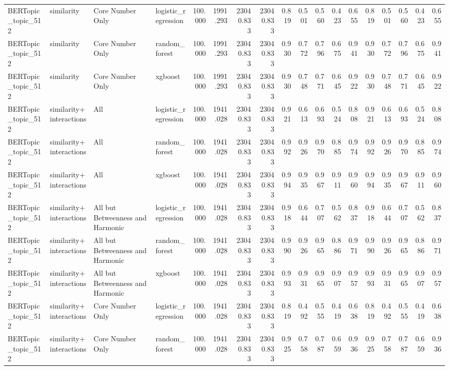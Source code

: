 \begin{tabular}{llllrrrrrrrrrrrrrr}
BERTopic\_topic\_512 & similarity & Core Number Only & logistic\_regression & 100.000 & 1991.293 & 23040.833 & 23040.833 & 0.819 & 0.501 & 0.560 & 0.423 & 0.655 & 0.819 & 0.501 & 0.560 & 0.423 & 0.655 \\
BERTopic\_topic\_512 & similarity & Core Number Only & random\_forest & 100.000 & 1991.293 & 23040.833 & 23040.833 & 0.930 & 0.772 & 0.796 & 0.675 & 0.941 & 0.930 & 0.772 & 0.796 & 0.675 & 0.941 \\
BERTopic\_topic\_512 & similarity & Core Number Only & xgboost & 100.000 & 1991.293 & 23040.833 & 23040.833 & 0.930 & 0.748 & 0.771 & 0.645 & 0.922 & 0.930 & 0.748 & 0.771 & 0.645 & 0.922 \\
BERTopic\_topic\_512 & similarity+interactions & All & logistic\_regression & 100.000 & 1941.028 & 23040.833 & 23040.833 & 0.921 & 0.613 & 0.693 & 0.524 & 0.808 & 0.921 & 0.613 & 0.693 & 0.524 & 0.808 \\
BERTopic\_topic\_512 & similarity+interactions & All & random\_forest & 100.000 & 1941.028 & 23040.833 & 23040.833 & 0.992 & 0.926 & 0.970 & 0.885 & 0.974 & 0.992 & 0.926 & 0.970 & 0.885 & 0.974 \\
BERTopic\_topic\_512 & similarity+interactions & All & xgboost & 100.000 & 1941.028 & 23040.833 & 23040.833 & 0.994 & 0.935 & 0.967 & 0.911 & 0.960 & 0.994 & 0.935 & 0.967 & 0.911 & 0.960 \\
BERTopic\_topic\_512 & similarity+interactions & All but Betweenness and Harmonic & logistic\_regression & 100.000 & 1941.028 & 23040.833 & 23040.833 & 0.918 & 0.644 & 0.707 & 0.562 & 0.837 & 0.918 & 0.644 & 0.707 & 0.562 & 0.837 \\
BERTopic\_topic\_512 & similarity+interactions & All but Betweenness and Harmonic & random\_forest & 100.000 & 1941.028 & 23040.833 & 23040.833 & 0.990 & 0.926 & 0.965 & 0.886 & 0.971 & 0.990 & 0.926 & 0.965 & 0.886 & 0.971 \\
BERTopic\_topic\_512 & similarity+interactions & All but Betweenness and Harmonic & xgboost & 100.000 & 1941.028 & 23040.833 & 23040.833 & 0.993 & 0.931 & 0.965 & 0.907 & 0.957 & 0.993 & 0.931 & 0.965 & 0.907 & 0.957 \\
BERTopic\_topic\_512 & similarity+interactions & Core Number Only & logistic\_regression & 100.000 & 1941.028 & 23040.833 & 23040.833 & 0.819 & 0.492 & 0.555 & 0.419 & 0.638 & 0.819 & 0.492 & 0.555 & 0.419 & 0.638 \\
BERTopic\_topic\_512 & similarity+interactions & Core Number Only & random\_forest & 100.000 & 1941.028 & 23040.833 & 23040.833 & 0.925 & 0.758 & 0.787 & 0.659 & 0.936 & 0.925 & 0.758 & 0.787 & 0.659 & 0.936 \\

\end{tabular}
